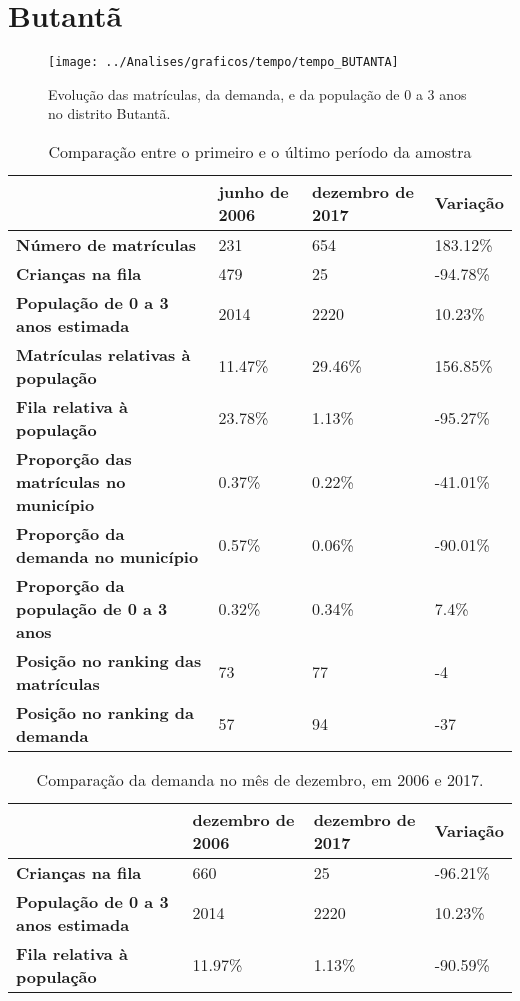 \section{Butantã}
\begin{figure}[H]
\centering
\texttt{[image: ../Analises/graficos/tempo/tempo\_BUTANTA]}
\caption{Evolução das matrículas, da demanda, e da população de 0 a 3 anos no distrito Butantã.}
\end{figure}
\begin{table}[H]
\begin{tabular}{|l|l|l|l|}
\hline
\textbf{}                                      & \textbf{junho de 2006}       & \textbf{dezembro de 2017}    & \textbf{Variação} \\ \hline
\textbf{Número de matrículas}                  & 231 & 654 & 183.12\% \\ \hline
\textbf{Crianças na fila}                      & 479 & 25 & -94.78\% \\ \hline
\textbf{População de 0 a 3 anos estimada}      & 2014 & 2220 & 10.23\% \\ \hline
\textbf{Matrículas relativas à população}      & 11.47\% & 29.46\% & 156.85\% \\ \hline
\textbf{Fila relativa à população}             & 23.78\% & 1.13\% & -95.27\% \\ \hline
\textbf{Proporção das matrículas no município} & 0.37\% & 0.22\% & -41.01\% \\ \hline
\textbf{Proporção da demanda no município}     & 0.57\% & 0.06\% & -90.01\% \\ \hline
\textbf{Proporção da população de 0 a 3 anos}  & 0.32\% & 0.34\% & 7.4\% \\ \hline
\textbf{Posição no ranking das matrículas}     & 73 & 77 & -4 \\ \hline
\textbf{Posição no ranking da demanda}         & 57 & 94 & -37 \\ \hline
\end{tabular}
\caption{Comparação entre o primeiro e o último período da amostra}
\end{table}
\begin{table}[H]
\begin{tabular}{|l|l|l|l|}
\hline
\textbf{}                                 & \textbf{dezembro de 2006} & \textbf{dezembro de 2017} & \textbf{Variação} \\ \hline
\textbf{Crianças na fila}                      & 660 & 25 & -96.21\% \\ \hline
\textbf{População de 0 a 3 anos estimada}      & 2014 & 2220 & 10.23\% \\ \hline
\textbf{Fila relativa à população}             & 11.97\% & 1.13\% & -90.59\% \\ \hline
\end{tabular}
\caption{Comparação da demanda no mês de dezembro, em 2006 e 2017.}
\end{table}
